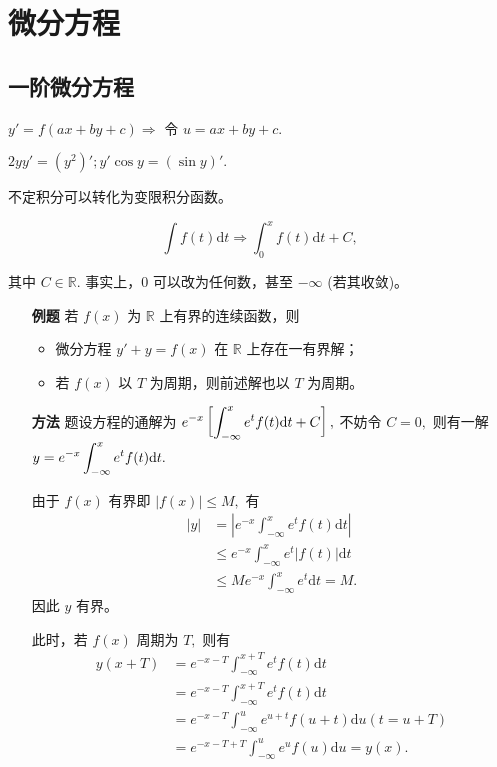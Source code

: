 \chapter{微分方程}

\section{一阶微分方程}

$ y' = f(ax+by+c) \Rightarrow  $ 令 $ u = ax+by+c. $ 

$ 2yy' = (y^2)'; y'\cos y = (\sin y)'. $ 


不定积分可以转化为变限积分函数。

$$
    \int f(t)\mathrm{d}t \Rightarrow \int_0^x f(t)\mathrm{d}t + C,
$$

其中 $ C\in\mathbb{R}. $ 事实上，$ 0 $ 可以改为任何数，甚至 $ -\infty $ (若其收敛)。


\begin{enumerate}
    \item[\textbf{例题}]
    若 $ f(x) $ 为 $ \mathbb{R} $ 上有界的连续函数，则
    \begin{itemize}
        \item 微分方程 $ y'+y=f(x) $ 在 $ \mathbb{R} $ 上存在一有界解；
        \item 若 $ f(x) $ 以 $ T $ 为周期，则前述解也以 $ T $ 为周期。
    \end{itemize}
    \item[\textbf{方法}] 
    题设方程的通解为 $ \displaystyle e^{-x}\left[\int_{-\infty}^x e^tf(t)\mathrm{d}t + C\right], $ 
    不妨令 $ C = 0, $ 则有一解 $ y = \displaystyle e^{-x}\int_{-\infty}^xe^tf(t)\mathrm{d}t. $ 

    由于 $ f(x) $ 有界即 $ |f(x)|\leq M, $ 有
    \begin{equation*}
        \begin{aligned}
            |y| &= \left|e^{-x}\int_{-\infty}^xe^tf(t)\mathrm{d}t\right|
            \\ &\leq e^{-x}\int_{-\infty}^xe^t|f(t)|\mathrm{d}t
            \\ &\leq Me^{-x}\int_{-\infty}^xe^t\mathrm{d}t = M.
        \end{aligned}
    \end{equation*}
    因此 $ y $ 有界。

    此时，若 $ f(x) $ 周期为 $ T, $ 则有
    \begin{equation*}
        \begin{aligned}
            y(x+T) &= e^{-x-T}\int_{-\infty}^{x+T}e^{t}f(t)\mathrm{d}t \\ 
            &= e^{-x-T}\int_{-\infty}^{x+T}e^{t}f(t)\mathrm{d}t \quad  \\ 
            &= e^{-x-T}\int_{-\infty}^{u}e^{u+t}f(u+t)\mathrm{d}u (t = u + T) \\ 
            &= e^{-x-T+T}\int_{-\infty}^ue^uf(u)\mathrm{d}u = y(x).
        \end{aligned}
    \end{equation*}
\end{enumerate}

